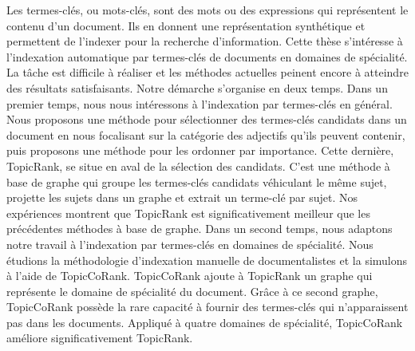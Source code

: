 Les termes-clés, ou mots-clés, sont des mots ou des expressions qui représentent
le contenu d'un document. Ils en donnent une représentation synthétique et
permettent de l'indexer pour la recherche d'information. Cette thèse s'intéresse
à l'indexation automatique par termes-clés de documents en domaines de
spécialité. La tâche est difficile à réaliser et les méthodes actuelles peinent
encore à atteindre des résultats satisfaisants. Notre démarche s'organise en
deux temps. Dans un premier temps, nous nous intéressons à l'indexation par
termes-clés en général. Nous proposons une méthode pour sélectionner des
termes-clés candidats dans un document en nous focalisant sur la catégorie des
adjectifs qu'ils peuvent contenir, puis proposons une méthode pour les ordonner
par importance. Cette dernière, TopicRank, se situe en aval de la sélection des
candidats. C'est une méthode à base de graphe qui groupe les termes-clés
candidats véhiculant le même sujet, projette les sujets dans un graphe et
extrait un terme-clé par sujet. Nos expériences montrent que TopicRank est
significativement meilleur que les précédentes méthodes à base de graphe. Dans
un second temps, nous adaptons notre travail à l'indexation par termes-clés en
domaines de spécialité. Nous étudions la méthodologie d'indexation manuelle de
documentalistes et la simulons à l'aide de TopicCoRank. TopicCoRank ajoute à
TopicRank un graphe qui représente le domaine de spécialité du document. Grâce
à ce second graphe, TopicCoRank possède la rare capacité à fournir des
termes-clés qui n'apparaissent pas dans les documents. Appliqué à quatre
domaines de spécialité, TopicCoRank améliore significativement TopicRank.

